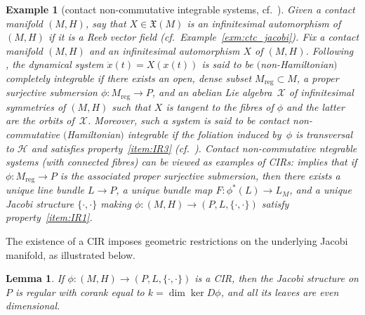 \documentclass[10pt,a4paper]{amsart}
\numberwithin{equation}{section}
\newtheorem{Lemma}[Theorem]{Lemma}
\newtheorem{Example}[Theorem]{Example}
\newcommand{\X}{\ensuremath{\mathfrak{X}}}
\newcommand{\JM}{(P,L,\{\cdot,\cdot\})} %
\newcommand{\CM}{(M,H)} %
\begin{document}
\begin{Example}[contact non-commutative integrable systems, cf.\ \cite{jovanovic}]\label{sec:cont-isotr-real-2}
Given a contact manifold $\CM$, say that $X \in \X(M)$ is an {\em infinitesimal automorphism} of $\CM$ if it is a Reeb vector f\/ield (cf.\ Example~\ref{exm:ctc_jacobi}). Fix a contact manifold $\CM$ and an inf\/initesimal automorphism $X$ of $\CM$. Following \cite[Section~5.1]{jovanovic}, the dynamical system $\dot{x}(t) = X(x(t))$ is said to be {\em $($non-Hamiltonian$)$ completely integrable} if there exists an open, dense subset $M_{\mathrm{reg}} \subset M$, a proper surjective submersion $\phi\colon M_{\mathrm{reg}} \to P$, and an abelian Lie algebra~$\mathcal{X}$ of inf\/initesimal symmetries of $\CM$ such that $X$ is tangent to the f\/ibres of $\phi$ and the latter are the orbits of~$\mathcal{X}$. Moreover, such a system is said to be {\em contact non-commutative $($Hamiltonian$)$ integrable} if the foliation induced by~$\phi$ is transversal to $\mathcal{H}$ and satisf\/ies property~\ref{item:IR3} (cf.\ \cite[Def\/initions~2 and~3]{jovanovic}). Contact non-commutative ntegrable systems (with connected f\/ibres) can be viewed as examples of CIRs: \cite[Theorem~3]{jovanovic} implies that if $\phi \colon M_{\mathrm{reg}} \to P$ is the associated proper surjective submersion, then there exists a unique line bundle $L \to P$, a unique bundle map $F \colon \phi^*(L) \to L_M$, and a unique Jacobi structure $\{\cdot,\cdot\}$ making $\phi \colon \CM \to \JM$ satisfy property~\ref{item:IR1}.
\end{Example}

The existence of a CIR imposes geometric restrictions on the underlying Jacobi manifold, as illustrated below.

\begin{Lemma}\label{lemma:regular} If $\phi\colon \CM\to \JM$ is a CIR, then the Jacobi structure on $P$ is regular with corank equal to $k = \dim \ker D\phi$, and all its leaves are even dimensional.
\end{Lemma}
\end{document}
